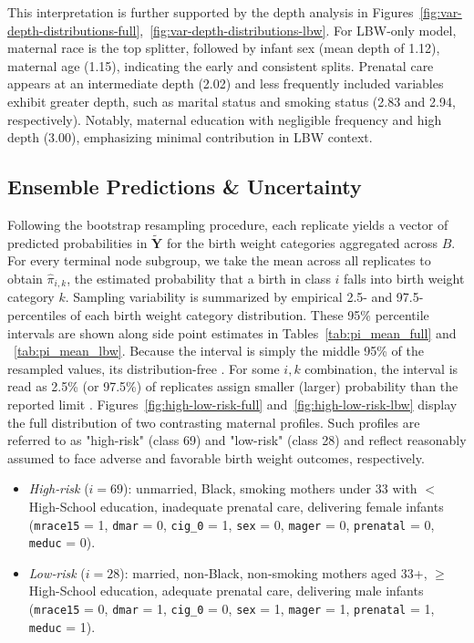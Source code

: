 This interpretation is further supported by the depth analysis in Figures~\ref{fig:var-depth-distributions-full},~\ref{fig:var-depth-distributions-lbw}. For LBW-only model, maternal race is the top splitter, followed by infant sex (mean depth of 1.12), maternal age (1.15), indicating the early and consistent splits. Prenatal care appears at an intermediate depth (2.02) and less frequently included variables exhibit greater depth, such as marital status and smoking status (2.83 and 2.94, respectively). Notably, maternal education with negligible frequency and high depth (3.00), emphasizing minimal contribution in LBW context. 


\subsection{Ensemble Predictions \& Uncertainty}
\label{sec:ch3-boot-pred}

Following the bootstrap resampling procedure, each replicate yields a vector of predicted probabilities in \(\tilde{\mathbf{Y}}\) for the birth weight categories aggregated across \(B\). For every terminal node subgroup, we take the mean across all replicates to obtain \(\hat{\pi}_{i,k}\), the estimated probability that a birth in class \(i\) falls into birth weight category \(k\). Sampling variability is summarized by empirical 2.5- and 97.5-percentiles of each birth weight category distribution. These 95\% percentile intervals are shown along side point estimates in Tables~\ref{tab:pi_mean_full} and ~\ref{tab:pi_mean_lbw}. Because the interval is simply the middle 95\% of the resampled values, its distribution-free \parencite{percentile-interval}.  For some \(i,k\) combination, the interval is read as 2.5\% (or 97.5\%) of replicates assign smaller (larger) probability than the reported limit \parencite{percentile-interval}. Figures~\ref{fig:high-low-risk-full} and~\ref{fig:high-low-risk-lbw} display the full distribution of two contrasting maternal profiles.  Such profiles are referred to as "high-risk" (class 69) and "low-risk" (class 28) and reflect reasonably assumed to face adverse and favorable birth weight outcomes, respectively.

\begin{itemize}
  \item \emph{High‑risk} (\(i=69\)): unmarried, Black, smoking mothers under 33 with $<$ High-School education, inadequate prenatal care, delivering female infants (\texttt{mrace15} = 1, \texttt{dmar} = 0, \texttt{cig\_0} = 1, \texttt{sex} = 0, \texttt{mager} = 0, \texttt{prenatal} = 0, \texttt{meduc} = 0).
  \item \emph{Low‑risk} (\(i=28\)): married, non‑Black, non‑smoking mothers aged 33+, $\geq$ High-School education, adequate prenatal care, delivering male infants (\texttt{mrace15} = 0, \texttt{dmar} = 1, \texttt{cig\_0} = 0, \texttt{sex} = 1, \texttt{mager} = 1, \texttt{prenatal} = 1, \texttt{meduc} = 1).
\end{itemize}

